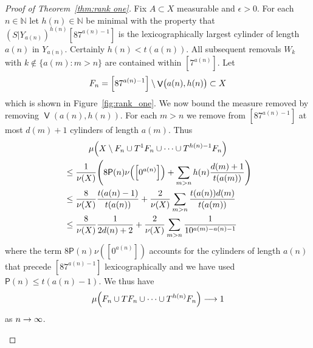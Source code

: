 \documentclass[10pt]{amsart}
\theoremstyle{definition}\newtheorem{defi}[theo]{Definition}\newtheorem{rema}[theo]{Remark}\newtheorem{exam}[theo]{Example}\newtheorem{exem}[theo]{Example}\newtheorem{nota}[theo]{Notation}
\DeclareMathOperator{\bad}{\mathsf{V}}
\newcommand{\N}{\mathbb{N}}
\renewcommand{\P}{\mathsf{P}}
\let\originalleft\left
\let\originalright\right
\renewcommand{\left}{\mathopen{}\mathclose\bgroup\originalleft}
\renewcommand{\right}{\aftergroup\egroup\originalright}
\renewcommand*{\to}{\mathchoice{\longrightarrow}{\rightarrow}{\rightarrow}{\rightarrow}}
\begin{document}
\begin{proof}[Proof of Theorem~\ref{thm:rank one}]
Fix $A \subset X$ measurable and $\epsilon > 0$. For each ${n \in \N}$ let $h(n) \in \N$ be minimal with the property that $(S|Y_{a(n)})^{h(n)} [8 7^{a(n)-1}]$ is the lexicographically largest cylinder of length $a(n)$ in $Y_{a(n)}$. Certainly $h(n) < t(a(n))$. All subsequent removals $W_k$ with $k \not\in \{a(m) : m > n \}$ are contained within $[7^{a(n)}]$. Let
\[
F_n=\left[87^{a(n)-1}\right]\setminus \bad \bigl(a(n),h(n)\bigr) \subset X
\]
which is shown in Figure~\ref{fig:rank_one}. We now bound the measure removed by removing $\bad(a(n),h(n))$. For each $m > n$ we remove from $[8 7^{a(n)-1}]$ at most $d(m) + 1$ cylinders of length $a(m)$. Thus
\begin{multline*}
\mu\left(X \setminus F_n \cup T^1 F_n \cup \dots \cup T^{h(n)-1} F_n\right)
\\
\begin{aligned}
&\le
\frac{1}{\nu(X)} \left(8 \P(n) \nu\left(\left[0^{a(n)}\right]\right) + \sum_{m > n} h(n) \frac{d(m)+1}{t(a(m))} \right)
\\
&\le
\frac{8}{\nu(X)} \frac{t(a(n)-1)}{t(a(n))} + \frac{2}{\nu(X)} \sum_{m > n} \frac{t(a(n)) d(m)}{t(a(m))}
\\
&\le
\frac{8}{\nu(X)} \frac{1}{2d(n)+2} + \frac{2}{\nu(X)} \sum_{m > n} \frac{1}{10^{a(m) - a(n)-1}}
\end{aligned}
\end{multline*}
where the term $8\P(n) \nu([0^{a(n)}])$ accounts for the cylinders of length $a(n)$ that precede $[87^{a(n)-1}]$ lexicographically and we have used $\P(n) \le t(a(n)-1)$. We thus have
\[
\mu\left(F_n \cup T F_n \cup \dots \cup T^{h(n)} F_n\right) \to 1
\]
as $n \to \infty$.

\begin{figure}[!h]

\centering

\end{figure}
\end{proof}
\end{document}

